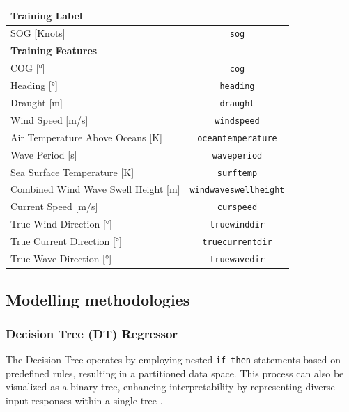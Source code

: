 \documentclass[]{interact}
\theoremstyle{plain}%
\theoremstyle{definition}
\theoremstyle{remark}
\begin{document}
\begin{table}
  {\begin{tabular}{ p{8cm}c }
  \hline
  \multicolumn{2}{l}{\textbf{Training Label}}\\
  \hline
  SOG [Knots] & {\tt sog} \\
  \hline
  \multicolumn{2}{l}{\textbf{Training Features}}\\
  \hline
  COG [°] & {\tt cog}  \\
  Heading [°] & {\tt heading}  \\
  Draught [m] & {\tt draught} \\
  Wind Speed [m/s] & {\tt windspeed} \\
  Air Temperature Above Oceans [K] & {\tt oceantemperature} \\
  Wave Period [s] & {\tt waveperiod}\\
  Sea Surface Temperature [K] & {\tt surftemp}\\
  Combined Wind Wave Swell Height [m] &  {\tt windwaveswellheight} \\
  Current Speed [m/s] & {\tt curspeed} \\
  True Wind Direction [°] & {\tt truewinddir}  \\
  True Current Direction [°] & {\tt truecurrentdir} \\
  True Wave Direction [°] & {\tt truewavedir} \\
  \hline
  \end{tabular}}
\label{tbl:struct_train_final}
\end{table}

\subsection{Modelling methodologies}\label{sec:tree_model_development}

\subsubsection{Decision Tree (DT) Regressor}\label{sec:dt_theo_j}

The Decision Tree operates by employing nested {\tt if-then} statements based on predefined rules, resulting in a partitioned data space. This process can also be visualized as a binary tree, enhancing interpretability by representing diverse input responses within a single tree \citet{Kuhn.2013, Hastie.2009}.\\
\end{document}
